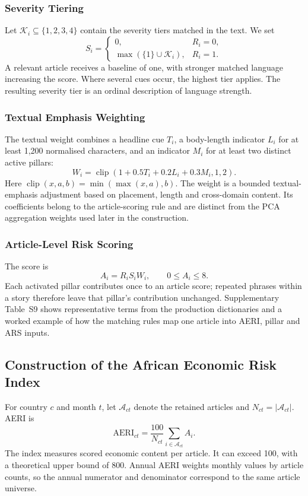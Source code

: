 \documentclass[12pt]{article}
\newcommand{\clip}{\operatorname{clip}}
\begin{document}
\subsubsection{Severity Tiering}\label{sec:severity_tiering}
Let $\mathcal K_i\subseteq\{1,2,3,4\}$ contain the severity tiers matched in the text. We set
\begin{equation} S_i=\begin{cases}0,&R_i=0,\\ \max(\{1\}\cup\mathcal K_i),&R_i=1.\end{cases}\label{eq:severity}\end{equation}
A relevant article receives a baseline of one, with stronger matched language increasing the score. Where several cues occur, the highest tier applies. The resulting severity tier is an ordinal description of language strength.
\subsubsection{Textual Emphasis Weighting}\label{sec:confidence_weighting}
The textual weight combines a headline cue $T_i$, a body-length indicator $L_i$ for at least 1,200 normalised characters, and an indicator $M_i$ for at least two distinct active pillars:
\begin{equation}W_i=\clip(1+0.5T_i+0.2L_i+0.3M_i,1,2).\label{eq:confidence}\end{equation}
Here $\clip(x,a,b)=\min(\max(x,a),b)$. The weight is a bounded textual-emphasis adjustment based on placement, length and cross-domain content. Its coefficients belong to the article-scoring rule and are distinct from the PCA aggregation weights used later in the construction.
\subsubsection{Article-Level Risk Scoring}\label{sec:article_scoring}
The score is
\begin{equation} A_i=R_iS_iW_i,\qquad 0\leq A_i\leq8.\label{eq:article}\end{equation}
Each activated pillar contributes once to an article score; repeated phrases within a story therefore leave that pillar's contribution unchanged. Supplementary Table~S9 shows representative terms from the production dictionaries and a worked example of how the matching rules map one article into AERI, pillar and ARS inputs.
\subsection{Construction of the African Economic Risk Index}\label{sec:aeri}
For country $c$ and month $t$, let $\mathcal A_{ct}$ denote the retained articles and $N_{ct}=|\mathcal A_{ct}|$. AERI is
\begin{equation}\mathrm{AERI}_{ct}=\frac{100}{N_{ct}}\sum_{i\in\mathcal A_{ct}}A_i.\label{eq:aeri}\end{equation}
The index measures scored economic content per article. It can exceed 100, with a theoretical upper bound of 800. Annual AERI weights monthly values by article counts, so the annual numerator and denominator correspond to the same article universe.
\end{document}

